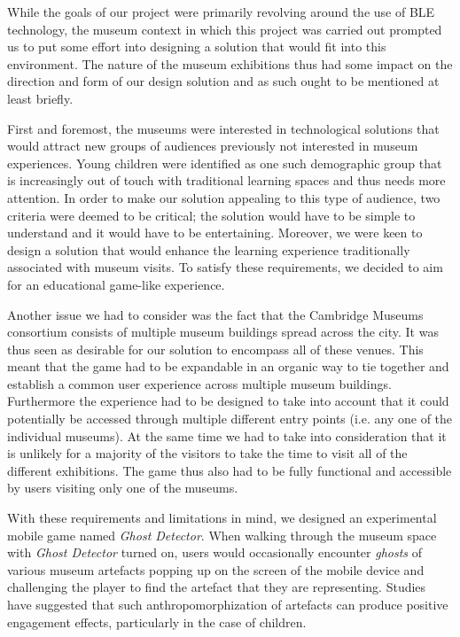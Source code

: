\documentclass[prodmode,acmtomm]{acmsmall}
\begin{document}
While the goals of our project were primarily revolving around the use of BLE technology, the museum context in which this project was carried out prompted us to put some effort into designing a solution that would fit into this environment. The nature of the museum exhibitions thus had some impact on the direction and form of our design solution and as such ought to be mentioned at least briefly. 

First and foremost, the museums were interested in technological solutions that would attract new groups of audiences previously not interested in museum experiences. Young children were identified as one such demographic group that is increasingly out of touch with traditional learning spaces and thus needs more attention. In order to make our solution appealing to this type of audience, two criteria were deemed to be critical; the solution would have to be simple to understand and it would have to be entertaining. Moreover, we were keen to design a solution that would enhance the learning experience traditionally associated with museum visits. To satisfy these requirements, we decided to aim for an educational game-like experience.



Another issue we had to consider was the fact that the Cambridge Museums consortium consists of multiple museum buildings spread across the city. It was thus seen as desirable for our solution to encompass all of these venues. This meant that the game had to be expandable in an organic way to tie together and establish a common user experience across multiple museum buildings. Furthermore the experience had to be designed to take into account that it could potentially be accessed through multiple different entry points (i.e. any one of the individual museums). At the same time we had to take into consideration that it is unlikely for a majority of the visitors to take the time to visit all of the different exhibitions. The game thus also had to be fully functional and accessible by users visiting only one of the museums. 

With these requirements and limitations in mind, we designed an experimental mobile game named \textit{Ghost Detector}. When walking through the museum space with \textit{Ghost Detector} turned on, users would occasionally encounter \textit{ghosts} of various museum artefacts popping up on the screen of the mobile device and challenging the player to find the artefact that they are representing. Studies have suggested that such anthropomorphization of artefacts can produce positive engagement effects, particularly in the case of children.\cite{vazquez2014} 
\end{document}
